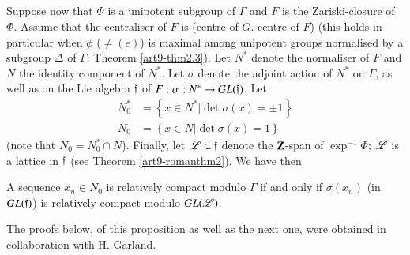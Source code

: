 \subsection{}\label{art9-subsec2.7}
Suppose now that $\Phi$ is a unipotent subgroup of $\Gamma$ and $F$ is the Zariski-closure of $\Phi$. Assume that the centraliser of $F$ is (centre of $G$. centre of $F$) (this holds in particular when $\phi$ ($\neq (e)$) is maximal among unipotent groups normalised by a subgroup $\Delta$ of $\Gamma$: Theorem \ref{art9-thm2.3}). Let $N^\ast$ denote the normaliser of $F$ and $N$ the identity component of $N^\ast$. Let $\sigma$ denote the adjoint action of $N^\ast$ on $F$, as well as on the Lie algebra $\mathfrak{f}$ of $F : \sigma : N^\ast \to G L (\mathfrak{f})$. Let 
\begin{align*}
N^\ast_0  & = \left\{x \in N^\ast \big| \det \sigma (x) = \pm 1 \right\}\\
N_0 & = \left\{x \in N \big| \det \sigma (x) = 1 \right\}
\end{align*}
(note that $N_0 = N^\ast_0 \cap N$). Finally, let $\mathscr{L} \subset \mathfrak{f}$ denote the $\mathbf{Z}$-span of $\exp^{-1} \Phi$; $\mathscr{L}$ is a lattice in $\mathfrak{f}$ (see Theorem \ref{art9-romanthm2}). We have then 

\setcounter{proposition}{7}
\begin{proposition}\label{art9-prop2.8}
A sequence $x_n \in N_0$ is relatively compact modulo $\Gamma$ if and only if $\sigma(x_n)$ (in $GL(\mathfrak{f})$) is relatively compact modulo $GL(\mathscr{L})$.
\end{proposition}

The proofs below, of this proposition as well as the next one, were obtained in collaboration with H. Garland.

\setcounter{subsection}{8}
